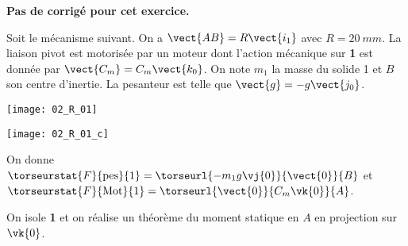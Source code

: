 \normaltrue
\correctionfalse


\setcounter{numques}{0}

\ifcorrection
\else
\textbf{Pas de corrigé pour cet exercice.}
\fi

\ifprof
\else
Soit le mécanisme suivant. On a $\vect{AB}=R\vect{i_1}$ avec $R=\SI{20}{mm}$. La liaison pivot est motorisée par un moteur dont l'action mécanique sur \textbf{1} est donnée par $\vect{C_m}=C_m \vect{k_0}$.
On note $m_1$ la masse du solide 1 et $B$ son centre d'inertie. 
 La pesanteur est telle que $\vect{g}=-g\vect{j_0}$.

\begin{center}
\texttt{[image: 02\_R\_01]}
\end{center}
\fi

\ifprof

\begin{center}
\texttt{[image: 02\_R\_01\_c]}
\end{center}
\else
\fi

On donne 
$\torseurstat{F}{\text{pes}}{1}=\torseurl{-m_1g\vj{0}}{\vect{0}}{B}$ et
$\torseurstat{F}{\text{Mot}}{1}=\torseurl{\vect{0}}{C_m\vk{0}}{A}$.

On isole \textbf{1} et on réalise un théorème du moment statique en $A$ en projection sur $\vk{0}$.

\ifprof
\else
\fi


\ifprof
\else
\fi

